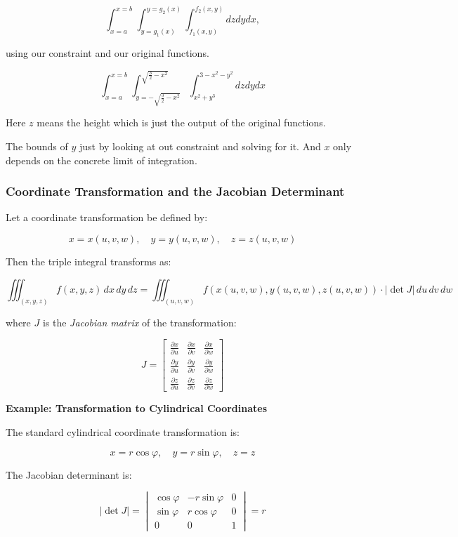 \[
    \int_{x=a}^{x=b}\int_{y=g_1(x)}^{y=g_2(x)} \int_{f_1(x,y)}^{f_2(x,y)} dz dy dx,
\]

using our constraint and our original functions.

\[
    \int_{x=a}^{x=b}\int_{y=-\sqrt{\frac{3}{2} - x^2}}^{\sqrt{\frac{3}{2} -x^2}} 
    \int_{x^2 + y^3}^{3-x^2-y^2} dz dy dx
\]

Here \(z\) means the height which is just the output
of the original functions.

The bounds of \(y\) just by looking at out constraint and solving for it.
And \(x\) only depends on the concrete limit of integration.

\subsubsection{Coordinate Transformation and the Jacobian Determinant}

Let a coordinate transformation be defined by:

\[
    x = x(u, v, w), \quad y = y(u, v, w), \quad z = z(u, v, w)
\]

Then the triple integral transforms as:

\[
    \iiint_{(x, y, z)} f(x, y, z)\, dx\, dy\, dz = \iiint_{(u, v, w)} f(x(u, v, w), y(u, v, w), 
    z(u, v, w)) \cdot \left| \det J \right|\, du\, dv\, dw
\]

where \( J \) is the \emph{Jacobian matrix} of the transformation:

\[
    J = 
    \begin{bmatrix}
    \frac{\partial x}{\partial u} & \frac{\partial x}{\partial v} & \frac{\partial x}{\partial w} \\
    \frac{\partial y}{\partial u} & \frac{\partial y}{\partial v} & \frac{\partial y}{\partial w} \\
    \frac{\partial z}{\partial u} & \frac{\partial z}{\partial v} & \frac{\partial z}{\partial w}
    \end{bmatrix}
\]

\textbf{Example: Transformation to Cylindrical Coordinates}

The standard cylindrical coordinate transformation is:

\[
    x = r \cos \varphi, \quad y = r \sin \varphi, \quad z = z
\]

The Jacobian determinant is:

\[
    \left| \det J \right| =
    \begin{vmatrix}
    \cos \varphi & -r \sin \varphi & 0 \\
    \sin \varphi & r \cos \varphi & 0 \\
    0 & 0 & 1
    \end{vmatrix}
    = r
\]

